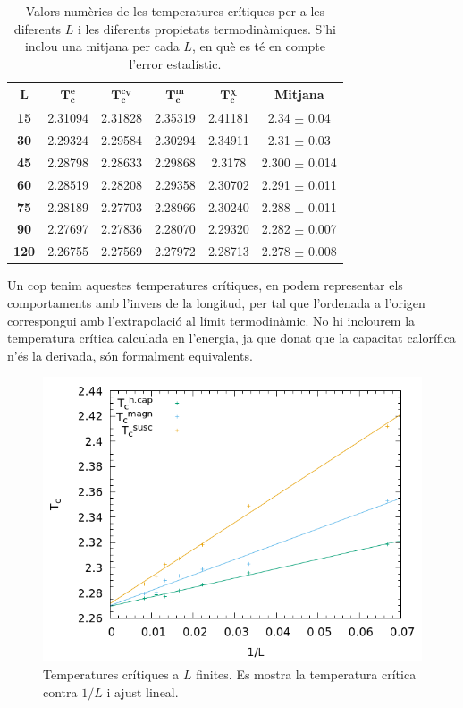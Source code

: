 \documentclass[a4paper]{article}
\begin{document}
\begin{table}[H]
\centering
\begin{tabular}{cccccc}
\hline
$\mathbf{L}$ & $\mathbf{T_c^e}$ & $\mathbf{T_c^{c_V}}$ & $\mathbf{T_c^m}$ & $\mathbf{T_c^\chi}$ & \textbf{Mitjana} \\ \hline
\textbf{15} & 2.31094 & 2.31828 & 2.35319 & 2.41181 & 2.34 $\pm$ 0.04 \\
\textbf{30} & 2.29324 & 2.29584 & 2.30294 & 2.34911 & 2.31 $\pm$ 0.03 \\
\textbf{45} & 2.28798 & 2.28633 & 2.29868 & 2.3178 & 2.300 $\pm$ 0.014 \\
\textbf{60} & 2.28519 & 2.28208 & 2.29358 & 2.30702 & 2.291 $\pm$ 0.011 \\
\textbf{75} & 2.28189 & 2.27703 & 2.28966 & 2.30240 & 2.288 $\pm$ 0.011 \\
\textbf{90} & 2.27697 & 2.27836 & 2.28070 & 2.29320 & 2.282 $\pm$ 0.007 \\
\textbf{120} & 2.26755 & 2.27569 & 2.27972 & 2.28713 & 2.278 $\pm$ 0.008
\end{tabular}
\caption{Valors numèrics de les temperatures crítiques per a les diferents $L$ i les diferents propietats termodinàmiques. S'hi inclou una mitjana per cada $L$, en què es té en compte l'error estadístic.}
\label{tab:tcs}
\end{table}

Un cop tenim aquestes temperatures crítiques, en podem representar els comportaments amb l'invers de la longitud, per tal que l'ordenada a l'origen correspongui amb l'extrapolació al límit termodinàmic. No hi inclourem la temperatura crítica calculada en l'energia, ja que donat que la capacitat calorífica n'és la derivada, són formalment equivalents.
\begin{figure}[H]
    \centering
    \includegraphics[width=.6\textwidth]{coefs-tc.png}
    \caption{Temperatures crítiques a $L$ finites. Es mostra la temperatura crítica contra $1/L$ i ajust lineal.}
    \label{fig:tc}
\end{figure}
\end{document}
